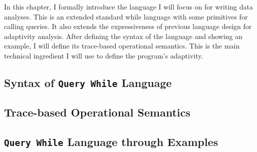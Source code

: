 In this chapter, 
I formally introduce the language I will focus on for writing data analyses.  
This is an extended standard while language with some primitives for calling queries.
It also extends the expressiveness of previous language design for adaptivity analysis.
After defining the syntax of the language and showing an example, 
I will define its trace-based operational semantics. 
This is the main technical ingredient I will use to define the program's adaptivity.
\subsection{Syntax of {\tt Query While} Language}
\label{sec:language-syntax}

\subsection{Trace-based Operational Semantics}
\label{sec:language-os}


\subsection{{\tt Query While} Language through Examples}
\label{sec:language-examples}

